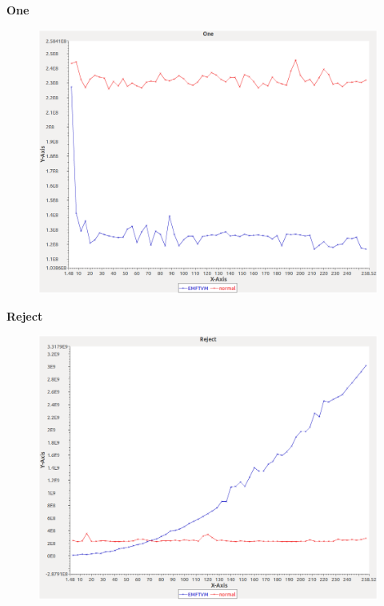 \noindent\textbf{One}

\begin{figure}[h]
\centering
\includegraphics[width=\textwidth]{graphs/bag/One}
\end{figure}
\pagebreak

\noindent\textbf{Reject}

\begin{figure}[h]
\centering
\includegraphics[width=\textwidth]{graphs/bag/Reject}
\end{figure}
\pagebreak

